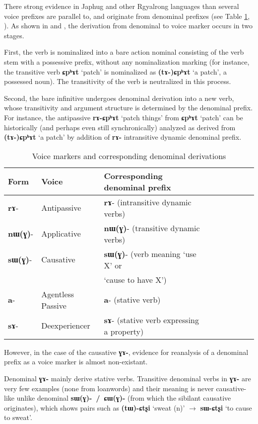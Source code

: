 \documentclass[oneside,a4paper,11pt]{article}
\newcommand{\ipa}[1]{\textbf{{\phon\mbox{#1}}}} %
\newcommand{\forme}[2]{\ipa{#1} `#2'}
\begin{document}
There strong evidence in Japhug and other Rgyalrong languages than several voice prefixes are parallel to, and originate from denominal prefixes (see Table \ref{tab:denom}, \citealt{jacques14antipassive}). As shown in \citet{jacques14antipassive} and \citet{jacques15causative}, the derivation from denominal to voice marker occurs in two stages.

First, the verb is nominalized into a bare action nominal consisting of the verb stem with a possessive prefix, without any nominalization marking (for instance, the transitive verb \forme{ɕpʰɤt}{patch} is nominalized as \forme{(tɤ-)ɕpʰɤt}{a patch}, a possessed noun). The transitivity of the verb is neutralized in this process. 

Second, the bare infinitive undergoes denominal derivation into a new verb, whose transitivity and argument structure is determined by the denominal prefix. For instance, the antipassive \forme{rɤ-ɕpʰɤt}{patch things} from  \forme{ɕpʰɤt}{patch} can be historically (and perhaps even still synchronically) analyzed as  derived from \forme{(tɤ-)ɕpʰɤt}{a patch} by addition of \ipa{rɤ-} intransitive dynamic denominal prefix. 

\begin{table}[H] \caption{Voice markers and corresponding denominal derivations} \label{tab:denom} \centering
\begin{tabular}{lllllllll} \toprule
Form& Voice & Corresponding denominal prefix \\
\midrule
\ipa{rɤ}- & Antipassive &    \ipa{rɤ}- (intransitive dynamic verbs)\\
\ipa{nɯ(ɣ)}- & Applicative &    \ipa{nɯ(ɣ)}- (transitive dynamic verbs)\\
\ipa{sɯ(ɣ)}- & Causative &    \ipa{sɯ(ɣ)}- (verb meaning `use X' or \\
&& `cause to have X') \\
\ipa{a}- & Agentless Passive &    \ipa{a}- (stative verb)\\
\ipa{sɤ}-  & Deexperiencer &    \ipa{sɤ}- (stative verb expressing a property)\\
    \bottomrule
\end{tabular}
\end{table}

However, in the case of the causative \ipa{ɣɤ-}, evidence for reanalysis of a denominal prefix as a voice marker is almost non-existant.

Denominal \ipa{ɣɤ-} mainly derive stative verbs. Transitive denominal verbs in \ipa{ɣɤ-} are very few examples (none from loanwords) and their meaning is never causative-like unlike denominal \ipa{sɯ(ɣ)- / ɕɯ(ɣ)-} (from which the sibilant causative originates), which shows pairs such as \forme{(tɯ)-ɕtʂi}{sweat (n)} $\rightarrow$ \forme{sɯ-ɕtʂi}{to cause to sweat}. 
\end{document}
